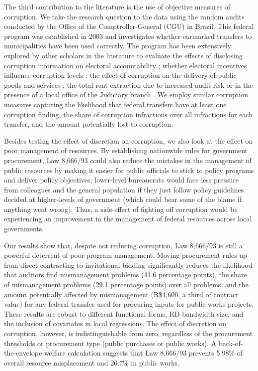 \documentclass[11pt]{article}
\begin{document}
The third contribution to the literature is the use of objective measures of corruption. We take the research question to the data using the random audits conducted by the Office of the Comptroller-General (CGU) in Brazil. This federal program was established in 2003 and investigates whether earmarked  transfers to municipalities have been used correctly. The program has been extensively explored by other scholars in the literature to evaluate the effects of disclosing corruption information on electoral accountability \citep{FerrazExposingCorruptPoliticians2008b}; whether electoral incentives influence corruption levels \citep{FerrazElectoralAccountabilityCorruption2011a}; the effect of corruption on the delivery of public goods and services \citep{FerrazCorruptinglearningEvidence2012,LichandCorruptionGoodYour2017}; the total rent extraction due to increased audit risk \citep{ZamboniAuditRiskRent2018} or in the presence of a local office of the Judiciary branch \citep{LitschigJudicialPresenceRent2015}. We employ similar corruption measures capturing the likelihood that federal transfers have at least one corruption finding, the share of corruption infractions over all infractions for each transfer, and the amount potentially lost to corruption.

Besides testing the effect of discretion on corruption, we also look at the effect on poor management of resources. By establishing nationwide rules for government procurement, Law 8,666/93 could also reduce the mistakes in the management of public resources by making it easier for public officials to stick to policy programs and deliver policy objectives; lower-level bureaucrats would face less pressure from colleagues and the general population if they just follow policy guidelines decided at higher-levels of government (which could bear some of the blame if anything went wrong). Thus, a side-effect of fighting off corruption would be experiencing an improvement in the management of federal resources across local governments.

Our results show that, despite not reducing corruption, Law 8,666/93 is still a powerful deterrent of poor program management. Moving procurement rules up from direct contracting to invitational bidding significantly reduces the likelihood that auditors find mismanagement problems (41.6 percentage points), the share of mismanagement problems (29.1 percentage points) over all problems, and the amount potentially affected by mismanagement (R\$4,600, a third of contract value) for any federal transfer used for procuring inputs for public works projects. These results are robust to different functional forms, RD bandwidth size, and the inclusion of covariates in local regressions.  The effect of discretion on corruption, however, is indistinguishable from zero, regardless of the procurement thresholds or procurement type (public purchases or public works). A back-of-the-envelope welfare calculation suggests that Law 8,666/93 prevents 5.98\% of overall resource misplacement and 26.7\% in public works.
\end{document}
